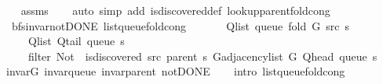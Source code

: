 \begin{isabellebody}
\endisataginvisible
{\isafoldinvisible}%
%
\isadeliminvisible
\isanewline
%
\endisadeliminvisible
%
\isadelimproof
\ \ %
\endisadelimproof
%
\isatagproof
{}\isamarkupfalse%
\ assms\isanewline
\ \ \isamarkupfalse%
\ {\isacharparenleft}{\kern0pt}auto\ simp\ add{\isacharcolon}{\kern0pt}\ is{\isacharunderscore}{\kern0pt}discovered{\isacharunderscore}{\kern0pt}def\ lookup{\isacharunderscore}{\kern0pt}parent{\isacharunderscore}{\kern0pt}fold{\isacharunderscore}{\kern0pt}cong{\isacharparenright}{\kern0pt}%
\endisatagproof
{\isafoldproof}%
%
\isadelimproof
\isanewline
%
\endisadelimproof
\isanewline
{}\isamarkupfalse%
\ {\isacharparenleft}{\kern0pt}\ bfs{\isacharunderscore}{\kern0pt}invar{\isacharunderscore}{\kern0pt}not{\isacharunderscore}{\kern0pt}DONE{\isacharparenright}{\kern0pt}\ list{\isacharunderscore}{\kern0pt}queue{\isacharunderscore}{\kern0pt}fold{\isacharunderscore}{\kern0pt}cong{\isacharcolon}{\kern0pt}\isanewline
\ \ \isanewline
\ \ \ \ {\isachardoublequoteopen}Q{\isacharunderscore}{\kern0pt}list\ {\isacharparenleft}{\kern0pt}queue\ {\isacharparenleft}{\kern0pt}fold\ G\ src\ s{\isacharparenright}{\kern0pt}{\isacharparenright}{\kern0pt}\ {\isacharequal}{\kern0pt}\isanewline
\ \ \ \ \ Q{\isacharunderscore}{\kern0pt}list\ {\isacharparenleft}{\kern0pt}Q{\isacharunderscore}{\kern0pt}tail\ {\isacharparenleft}{\kern0pt}queue\ s{\isacharparenright}{\kern0pt}{\isacharparenright}{\kern0pt}\ {\isacharat}{\kern0pt}\isanewline
\ \ \ \ \ filter\ {\isacharparenleft}{\kern0pt}Not\ {\isasymcirc}\ is{\isacharunderscore}{\kern0pt}discovered\ src\ {\isacharparenleft}{\kern0pt}parent\ s{\isacharparenright}{\kern0pt}{\isacharparenright}{\kern0pt}\ {\isacharparenleft}{\kern0pt}G{\isachardot}{\kern0pt}adjacency{\isacharunderscore}{\kern0pt}list\ G\ {\isacharparenleft}{\kern0pt}Q{\isacharunderscore}{\kern0pt}head\ {\isacharparenleft}{\kern0pt}queue\ s{\isacharparenright}{\kern0pt}{\isacharparenright}{\kern0pt}{\isacharparenright}{\kern0pt}{\isachardoublequoteclose}\isanewline
%
\isadelimproof
\ \ %
\endisadelimproof
%
\isatagproof
{}\isamarkupfalse%
\ invar{\isacharunderscore}{\kern0pt}G\ invar{\isacharunderscore}{\kern0pt}queue\ invar{\isacharunderscore}{\kern0pt}parent\ not{\isacharunderscore}{\kern0pt}DONE\isanewline
\ \ \isamarkupfalse%
\ {\isacharparenleft}{\kern0pt}intro\ list{\isacharunderscore}{\kern0pt}queue{\isacharunderscore}{\kern0pt}fold{\isacharunderscore}{\kern0pt}cong{\isacharunderscore}{\kern0pt}{}{\isacharparenright}{\kern0pt}%
\endisatagproof

\end{isabellebody}
